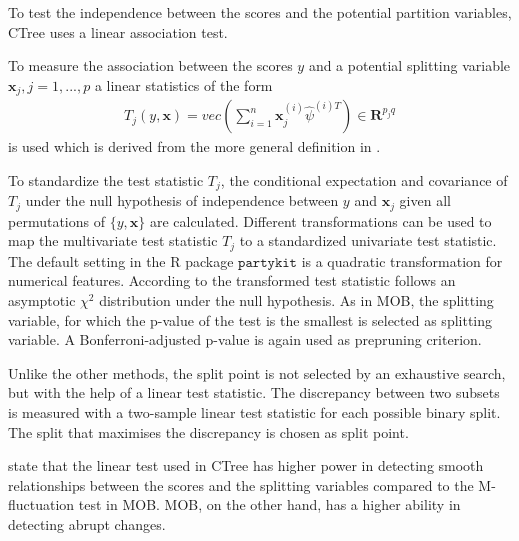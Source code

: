 To test the independence between the scores and the potential partition variables, CTree uses a linear association test.

To measure the association between the scores $y$ and a potential splitting variable $\textbf{x}_{j}, j = 1,...,p$ a linear statistics of the form 
\begin{align}
    T_{j}(y,\textbf{x}) = vec\left(\sum_{i=1}^n \textbf{x}_j^{(i)}\hat{\psi}^{(i)T}\right) \in \mathbf{R}^{p_{j} q}
\end{align}
is used which is derived from the more general definition in \citep{Hothorn.2006}.

To standardize the test statistic $T_{j}$, the conditional expectation and covariance of $T_{j}$ under the null hypothesis of independence between $y$ and $\textbf{x}_j$ given all permutations of $\{y,\textbf{x}\}$ are calculated.
Different transformations can be used to map the multivariate test statistic $T_{j}$ to a standardized univariate test statistic. The default setting in the R package $\mathtt{partykit}$  \citep{Hothorn.2015b} is a quadratic transformation for numerical features. According to  \citep{Hothorn.2006} the transformed test statistic follows an asymptotic $\chi^2$ distribution under the null hypothesis.
As in MOB, the splitting variable, for which the p-value of the test is the smallest is selected as splitting variable. A Bonferroni-adjusted p-value is again used as prepruning criterion.



Unlike the other methods, the split point is not selected by an exhaustive search, but with the help of a linear test statistic. The discrepancy between two subsets is measured with a two-sample linear test statistic for each possible binary split. The split that maximises the discrepancy is chosen as split point. \citep{Hothorn.2006}

\citet{Schlosser.2019} state that the linear test used in CTree has higher power in detecting smooth relationships between the scores and the splitting variables compared to the M-fluctuation test in MOB. MOB, on the other hand, has a higher ability in detecting abrupt changes.


